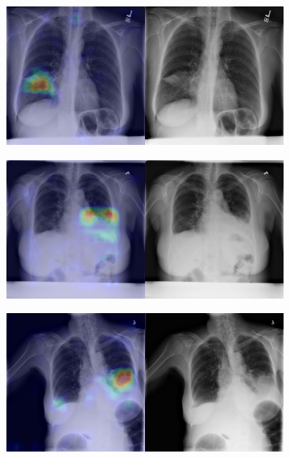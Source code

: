 \begin{figure}[b]
\begin{subfigure}{0.4\textwidth}
    \end{subfigure}
    \begin{subfigure}{0.4\textwidth}
        \centering
        \includegraphics[width=1.0\textwidth]{Chapters/5. Conclusiones/img/Consolidation/1_1_00000618_011.png}
    \end{subfigure}
    \begin{subfigure}{0.4\textwidth}
        \centering
        \includegraphics[width=1.0\textwidth]{Chapters/5. Conclusiones/img/Consolidation/1_1_00000808_002.png}
    \end{subfigure}
    \begin{subfigure}{0.4\textwidth}
        \centering
        \includegraphics[width=1.0\textwidth]{Chapters/5. Conclusiones/img/Consolidation/1_1_00000882_003.png}

\end{subfigure}
\end{figure}
